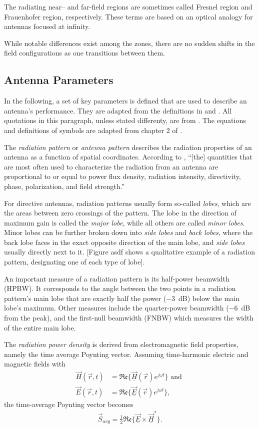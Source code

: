 The radiating near-- and far-field regions are sometimes called Fresnel region and Frauenhofer region, respectively.
These terms are based on an optical analogy for antennas focused at infinity.

While notable differences exist among the zones,
there are no sudden shifts in the field configurations as one transitions between them.

\subsection{Antenna Parameters}
\label{sec:antenna_params}
In the following, a set of key parameters is defined that are used to describe an antenna's performance.
They are adapted from the definitions in \cite{ieee_defs} and \cite{balanis}.
All quotations in this paragraph, unless stated differenty, are from \cite{ieee_defs}.
The equations and definitions of symbols are adapted from chapter 2 of \cite{balanis}.

The \emph{radiation pattern} or \emph{antenna pattern}
describes the radiation properties of an antenna as a function of spatial coordinates.
According to \cite{ieee_defs}, ``[the] quantities that are most often used to characterize the radiation from an antenna
are proportional to or equal to power flux density,
radiation intensity, directivity, phase, polarization, and field strength.''

For directive antennas, radiation patterns usually form so-called \emph{lobes},
which are the areas between zero crossings of the pattern.
The lobe in the direction of maximum gain is called the \emph{major lobe},
while all others are called \emph{minor lobes}.
Minor lobes can be further broken down into \emph{side lobes} and \emph{back lobes},
where the back lobe faces in the exact opposite direction of the main lobe,
and \emph{side lobes} usually directly next to it.
    [Figure asdf shows a qualitative example of a radiation pattern,
        designating one of each type of lobe].

An important measure of a radiation pattern is its half-power beamwidth (HPBW).
It corresponds to the angle between the two points
in a radiation pattern's main lobe that are exactly half the power (\SI{-3}{\dB})
below the main lobe's maximum. Other measures include the quarter-power beamwidth
(\SI{-6}{\dB} from the peak), and the first-null beamwidth (FNBW) which measures the width of the entire main lobe.

The \emph{radiation power density} is derived from electromagnetic field properties,
namely the time average Poynting vector.
Assuming time-harmonic electric and magnetic fields with
\begin{align}
    \vec H(\vec r, t) & = \mathfrak{Re}\{\vec{\underline{H}}(\vec{r}) e^{j\omega t}\} \text{ and } \\
    \vec E(\vec r, t) & = \mathfrak{Re}\{\vec{\underline{E}}(\vec{r}) e^{j\omega t}\},
\end{align}
the time-average Poynting vector becomes
\begin{align}
    \vec S_{avg} = \frac{1}{2} \mathfrak{Re}\{ \underline{\vec E} \times \underline{\vec H}^* \}.
\end{align}

